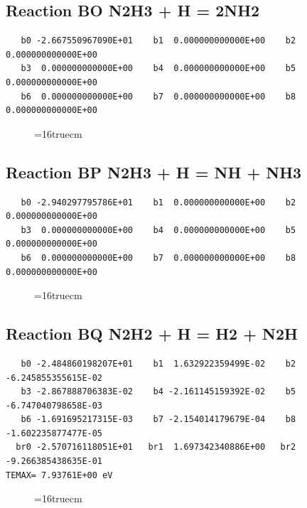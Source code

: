 \documentclass[12pt,dvipdfm]{article}
\begin{document}
\subsection{
Reaction BO N2H3 + H =  2NH2 }
\begin{small}\begin{verbatim}
   b0 -2.667550967090E+01    b1  0.000000000000E+00    b2  0.000000000000E+00
   b3  0.000000000000E+00    b4  0.000000000000E+00    b5  0.000000000000E+00
   b6  0.000000000000E+00    b7  0.000000000000E+00    b8  0.000000000000E+00
   \end{verbatim}\end{small}
\begin{figure}[h!]
\label{n2rates}
\epsfxsize=16truecm
\end{figure}
\newpage

\subsection{
Reaction BP N2H3 + H = NH + NH3}
\begin{small}\begin{verbatim}
   b0 -2.940297795786E+01    b1  0.000000000000E+00    b2  0.000000000000E+00
   b3  0.000000000000E+00    b4  0.000000000000E+00    b5  0.000000000000E+00
   b6  0.000000000000E+00    b7  0.000000000000E+00    b8  0.000000000000E+00
   \end{verbatim}\end{small}
\begin{figure}[h!]
\label{n2rates}
\epsfxsize=16truecm
\end{figure}
\newpage

\subsection{
Reaction BQ N2H2 + H = H2 + N2H }
\begin{small}\begin{verbatim}
   b0 -2.484860198207E+01    b1  1.632922359499E-02    b2 -6.245855355615E-02
   b3 -2.867888706383E-02    b4 -2.161145159392E-02    b5 -6.747040798658E-03
   b6 -1.691695217315E-03    b7 -2.154014179679E-04    b8 -1.602235877477E-05
  br0 -2.570716118051E+01   br1  1.697342340886E+00   br2 -9.266385438635E-01
TEMAX= 7.93761E+00 eV
   \end{verbatim}\end{small}
\begin{figure}[h!]
\label{n2rates}
\epsfxsize=16truecm
\end{figure}
\newpage
\end{document}
